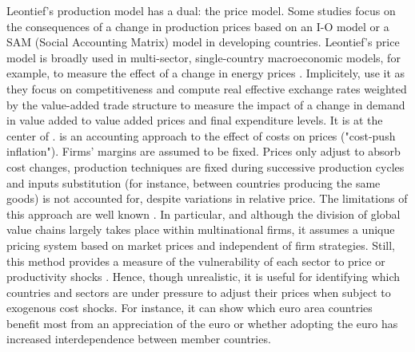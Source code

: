 \documentclass[11pt,a4paper]{article}
\begin{document}
Leontief's production model has a dual: the price model. Some studies focus on the consequences of a change in production prices based on an I-O model or a SAM (Social Accounting Matrix) model in developing countries. Leontief's price model is broadly used in multi-sector, single-country macroeconomic models, for example, to measure the effect of a change in energy prices \citep{Bournay2015, Sharify2013}. Implicitely, \cite{Bems2015} use it as they focus on competitiveness and compute real effective exchange rates weighted by the value-added trade structure to measure the impact of a change in demand in value added to value added prices and final expenditure levels. It is at the center of  \cite{Cochard2016}. 
\cite{Cochard2016} is an accounting approach to the effect of costs on prices ("cost-push inflation"). Firms' margins are assumed to be fixed. Prices only adjust to absorb cost changes, production techniques are fixed during successive production cycles and inputs substitution (for instance, between countries producing the same goods) is not accounted for, despite variations in relative price. The limitations of this approach are well known \citep{Folloni1994}. In particular, and although the division of global value chains largely takes place within multinational firms, it assumes a unique pricing system based on market prices and independent of firm strategies. Still, this method provides a measure of the vulnerability of each sector to price or productivity shocks \citep{Acemoglu2012,Carvalho2014}. Hence, though unrealistic, it is useful for identifying which countries and sectors are under pressure to adjust their prices when subject to exogenous cost shocks. For instance, it can show which euro area countries benefit most from an appreciation of the euro or whether adopting the euro has increased interdependence between member countries.
\end{document}
